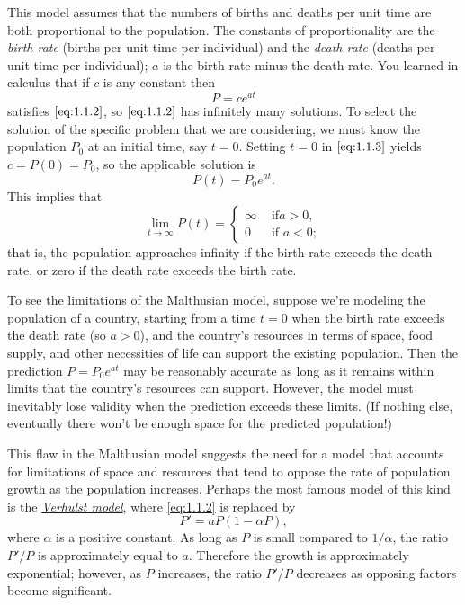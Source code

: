 \documentclass{ximera}
\begin{document}
This model assumes that the numbers of births and deaths per unit time
are both proportional to the population. The constants of
proportionality are  the \textit{birth rate} (births per unit
time per individual) and the \textit{death rate} (deaths per unit time
per individual);     $a$ is the birth rate minus the death rate.
You  learned in calculus that if $c$ is any constant then
\begin{equation} \label{eq:1.1.3}
P=ce^{at}
\end{equation}
satisfies $\eqref{eq:1.1.2}$, so $\eqref{eq:1.1.2}$ has infinitely
many solutions. To select the solution of the specific problem that
we are considering, we must know the population $P_0$ at an initial
time, say $t=0$. Setting $t=0$ in $\eqref{eq:1.1.3}$ yields
$c=P(0)=P_0$, so the applicable solution is
$$
P(t)=P_0e^{at}.
$$
This implies that
$$
\lim_{t\rightarrow\infty}P(t)=\left\{\begin{array}{cl}\infty&\mbox{ if
}a>0,\\ 0&\mbox{ if }a<0;    \end{array}\right.
$$
that is, the population approaches infinity if the birth rate exceeds
the death rate, or zero if the death rate exceeds the birth rate.
 
To see the limitations of the Malthusian model, suppose  we're
modeling the  population of a country, starting from a time
$t=0$ when the birth rate exceeds the death rate (so $a>0$), and
the country's resources in terms of space, food supply, and other
necessities of life can support the existing population. Then the
prediction $P=P_0e^{at}$ may be reasonably accurate as long as
it remains within limits that the country's resources can support.
However, the model must inevitably lose validity when the prediction
exceeds these limits. (If nothing else, eventually there won't be
enough space for the predicted population!)
 
This flaw in the Malthusian model suggests the need for a model that
accounts for limitations of space and resources that tend to oppose
the rate of population growth as the population increases.
 Perhaps the most famous model of this kind is the
\href{http://www-history.mcs.st-and.ac.uk/Mathematicians/Verhulst.html}
{\textit{Verhulst
 model}}, where \eqref{eq:1.1.2} is
replaced by
\begin{equation} \label{eq:1.1.4}
P'=aP(1-\alpha P),
\end{equation}
where $\alpha$ is a positive constant.
As long as $P$ is small
compared to $1/\alpha$, the ratio $P'/P$  is approximately equal to $a$.
Therefore the growth is approximately exponential;     however, as $P$
increases, the ratio $P'/P$  decreases as opposing factors
become significant.
 
\end{document}
